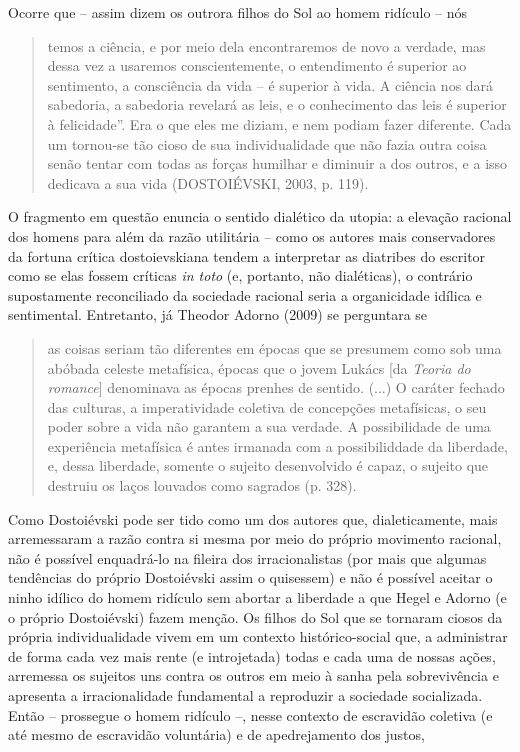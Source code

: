 Ocorre que -- assim dizem os outrora filhos do Sol ao homem ridículo --
nós

\begin{quote}
temos a ciência, e por meio dela encontraremos de novo a verdade, mas
dessa vez a usaremos conscientemente, o entendimento é superior ao
sentimento, a consciência da vida -- é superior à vida. A ciência nos
dará sabedoria, a sabedoria revelará as leis, e o conhecimento das leis
é superior à felicidade''. Era o que eles me diziam, e nem podiam fazer
diferente. Cada um tornou-se tão cioso de sua individualidade que não
fazia outra coisa senão tentar com todas as forças humilhar e diminuir a
dos outros, e a isso dedicava a sua vida (DOSTOIÉVSKI, 2003, p. 119).
\end{quote}

O fragmento em questão enuncia o sentido dialético da utopia: a elevação
racional dos homens para além da razão utilitária -- como os autores
mais conservadores da fortuna crítica dostoievskiana tendem a
interpretar as diatribes do escritor como se elas fossem críticas
\emph{in toto} (e, portanto, não dialéticas), o contrário supostamente
reconciliado da sociedade racional seria a organicidade idílica e
sentimental. Entretanto, já Theodor Adorno (2009) se perguntara se

\begin{quote}
as coisas seriam tão diferentes em épocas que se presumem como sob uma
abóbada celeste metafísica, épocas que o jovem Lukács {[}da \emph{Teoria
do romance}{]} denominava as épocas prenhes de sentido. (...) O caráter
fechado das culturas, a imperatividade coletiva de concepções
metafísicas, o seu poder sobre a vida não garantem a sua verdade. A
possibilidade de uma experiência metafísica é antes irmanada com a
possibiliddade da liberdade, e, dessa liberdade, somente o sujeito
desenvolvido é capaz, o sujeito que destruiu os laços louvados como
sagrados (p. 328).
\end{quote}

Como Dostoiévski pode ser tido como um dos autores que, dialeticamente,
mais arremessaram a razão contra si mesma por meio do próprio movimento
racional, não é possível enquadrá-lo na fileira dos irracionalistas (por
mais que algumas tendências do próprio Dostoiévski assim o quisessem) e
não é possível aceitar o ninho idílico do homem ridículo sem abortar a
liberdade a que Hegel e Adorno (e o próprio Dostoiévski) fazem menção.
Os filhos do Sol que se tornaram ciosos da própria individualidade vivem
em um contexto histórico-social que, a administrar de forma cada vez
mais rente (e introjetada) todas e cada uma de nossas ações, arremessa
os sujeitos uns contra os outros em meio à sanha pela sobrevivência e
apresenta a irracionalidade fundamental a reproduzir a sociedade
socializada. Então -- prossegue o homem ridículo --, nesse contexto de
escravidão coletiva (e até mesmo de escravidão voluntária) e de
apedrejamento dos justos,

